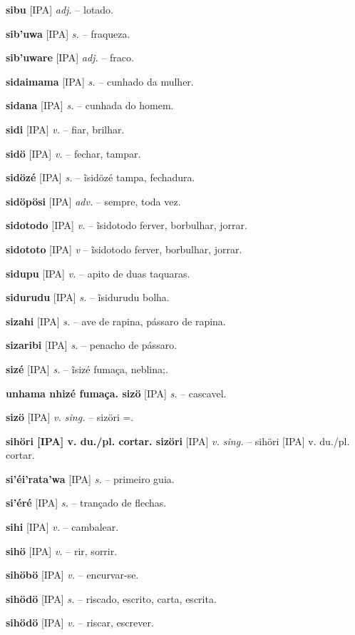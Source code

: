 {\textbf{sibu} [IPA] \textit{adj.} -- lotado.

\textbf{sib'uwa} [IPA] \textit{s.} -- fraqueza.

\textbf{sib'uware} [IPA] \textit{adj.} -- fraco.

\textbf{sidaimama} [IPA] \textit{s.} -- cunhado da mulher.

\textbf{sidana} [IPA] \textit{s.} -- cunhada do homem.

\textbf{sidi} [IPA] \textit{v.} -- fiar, brilhar.

\textbf{sidö} [IPA] \textit{v.} -- fechar, tampar.

\textbf{sidözé} [IPA] \textit{s.} -- ĩsidözé tampa, fechadura.

\textbf{sidöpösi} [IPA] \textit{adv.} -- sempre, toda vez.

\textbf{sidotodo} [IPA] \textit{v.} -- ĩsidotodo ferver, borbulhar, jorrar.

\textbf{sidototo} [IPA] \textit{v} -- ĩsidotodo ferver, borbulhar, jorrar.

\textbf{sidupu} [IPA] \textit{v.} -- apito de duas taquaras.

\textbf{sidurudu} [IPA] \textit{s.} -- ĩsidurudu bolha.

\textbf{sizahi} [IPA] \textit{s.} -- ave de rapina, pássaro de rapina.

\textbf{sizaribi} [IPA] \textit{s.} -- penacho de pássaro.

\textbf{sizé} [IPA] \textit{s.} -- ĩsizé fumaça, neblina;.

\textbf{unhama nhizé fumaça. sizö} [IPA] \textit{s.} -- cascavel.

\textbf{sizö} [IPA] \textit{v. sing.} -- sizöri =.

\textbf{sihöri [IPA] v. du./pl. cortar. sizöri} [IPA] \textit{v. sing.} -- sihöri [IPA] v. du./pl. cortar.

\textbf{si'éi'rata'wa} [IPA] \textit{s.} -- primeiro guia.

\textbf{si'éré} [IPA] \textit{s.} -- trançado de flechas.

\textbf{sihi} [IPA] \textit{v.} -- cambalear.

\textbf{sihö} [IPA] \textit{v.} -- rir, sorrir.

\textbf{sihöbö} [IPA] \textit{v.} -- encurvar-se.

\textbf{sihödö} [IPA] \textit{s.} -- riscado, escrito, carta, escrita.

\textbf{sihödö} [IPA] \textit{v.} -- riscar, escrever.

}
